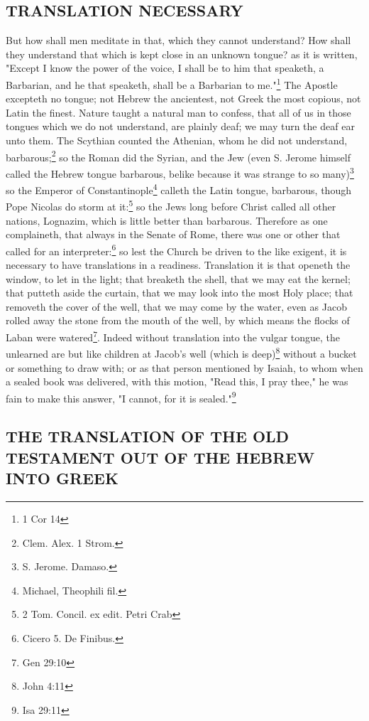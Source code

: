 \subsection{TRANSLATION NECESSARY}

But how shall men meditate in that, which they cannot understand? How shall they understand that which is kept close in an unknown tongue? as it is written, "Except I know the power of the voice, I shall be to him that speaketh, a Barbarian, and he that speaketh, shall be a Barbarian to me."\footnote{1 Cor 14} The Apostle excepteth no tongue; not Hebrew the ancientest, not Greek the most copious, not Latin the finest. Nature taught a natural man to confess, that all of us in those tongues which we do not understand, are plainly deaf; we may turn the deaf ear unto them. The Scythian counted the Athenian, whom he did not understand, barbarous;\footnote{Clem. Alex. 1 Strom.} so the Roman did the Syrian, and the Jew (even S. Jerome himself called the Hebrew tongue barbarous, belike because it was strange to so many)\footnote{S. Jerome. Damaso.} so the Emperor of Constantinople\footnote{Michael, Theophili fil.} calleth the Latin tongue, barbarous, though Pope Nicolas do storm at it:\footnote{2 Tom. Concil. ex edit. Petri Crab} so the Jews long before Christ called all other nations, Lognazim, which is little better than barbarous. Therefore as one complaineth, that always in the Senate of Rome, there was one or other that called for an interpreter:\footnote{Cicero 5. De Finibus.} so lest the Church be driven to the like exigent, it is necessary to have translations in a readiness. Translation it is that openeth the window, to let in the light; that breaketh the shell, that we may eat the kernel; that putteth aside the curtain, that we may look into the most Holy place; that removeth the cover of the well, that we may come by the water, even as Jacob rolled away the stone from the mouth of the well, by which means the flocks of Laban were watered\footnote{Gen 29:10}. Indeed without translation into the vulgar tongue, the unlearned are but like children at Jacob's well (which is deep)\footnote{John 4:11} without a bucket or something to draw with; or as that person mentioned by Isaiah, to whom when a sealed book was delivered, with this motion, "Read this, I pray thee," he was fain to make this answer, "I cannot, for it is sealed."\footnote{Isa 29:11}

\subsection{THE TRANSLATION OF THE OLD TESTAMENT OUT OF THE HEBREW INTO GREEK}


